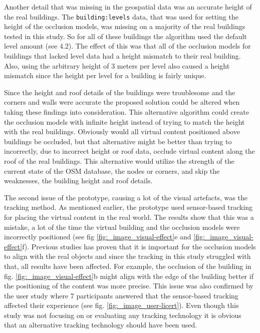 Another detail that was missing in the geospatial data was an accurate height of the real buildings. The \texttt{building:levels} data, that was used for setting the height of the occlusion models, was missing on a majority of the real buildings tested in this study. So for all of these buildings the algorithm used the default level amount (see 4.2). The effect of this was that all of the occlusion models for buildings that lacked level data had a height mismatch to their real building. Also, using the arbitrary height of 3 meters per level also caused a height mismatch since the height per level for a building is fairly unique. 

Since the height and roof details of the buildings were troublesome and the corners and walls were accurate the proposed solution could be altered when taking these findings into consideration. This alternative algorithm could create the occlusion models with infinite height instead of trying to match the height with the real buildings. Obviously would all virtual content positioned above buildings be occluded, but that alternative might be better than trying to incorrectly, due to incorrect height or roof data, occlude virtual content along the roof of the real buildings. This alternative would utilize the strength of the current state of the OSM database, the nodes or corners, and skip the weaknesses, the building height and roof details. 

The second issue of the prototype, causing a lot of the visual artefacts, was the tracking method. As mentioned earlier, the prototype used sensor-based tracking for placing the virtual content in the real world. The results show that this was a mistake, a lot of the time the virtual building and the occlusion models were incorrectly positioned (see fig \ref{fig:_image_visual-effect}e and \ref{fig:_image_visual-effect}f). Previous studies has proven that it is important for the occlusion models to align with the real objects and since the tracking in this study struggled with that, all results have been affected. For example, the occlusion of the building in fig. \ref{fig:_image_visual-effect}b might align with the edge of the building better if the positioning of the content was more precise. This issue was also confirmed by the user study where 7 participants answered that the sensor-based tracking affected their experience (see fig. \ref{fig:_image_user-licert}). Even though this study was not focusing on or evaluating any tracking technology it is obvious that an alternative tracking technology should have been used.

